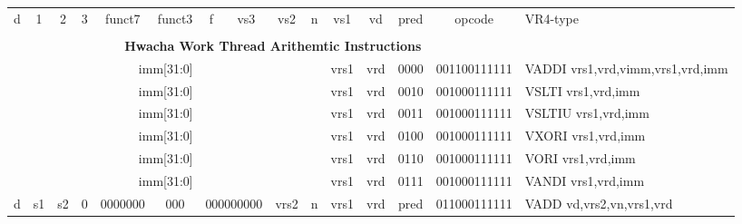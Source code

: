 \begin{landscape}
\begin{table}[p]
\begin{small}
\begin{center}
\begin{tabular}{p{0.08in}@{}p{0.08in}@{}p{0.08in}@{}p{0.08in}@{}p{0.50in}@{}p{0.30in}@{}p{0.08in}@{}p{0.8in}@{}p{0.48in}@{}p{0.32in}@{}p{0.08in}@{}p{0.8in}@{}p{0.8in}@{}p{0.4in}@{}p{0.56in}l}
\multicolumn{1}{|c|}{d} &
\multicolumn{1}{c|}{1} &
\multicolumn{1}{c|}{2} &
\multicolumn{1}{c|}{3} &
\multicolumn{1}{c|}{funct7} &
\multicolumn{1}{c|}{funct3} &
\multicolumn{1}{c|}{f} &
\multicolumn{1}{c|}{vs3} &
\multicolumn{2}{c|}{vs2} &
\multicolumn{1}{c|}{n} &
\multicolumn{1}{c|}{vs1} &
\multicolumn{1}{c|}{vd} &
\multicolumn{1}{c|}{pred} &
\multicolumn{1}{c|}{opcode} &
VR4-type \\
\cline{1-15}


&
\multicolumn{14}{c}{} & \\
&
\multicolumn{14}{c}{\bf Hwacha Work Thread Arithemtic Instructions} & \\
\cline{1-15}
  

\multicolumn{11}{|c|}{imm[31:0]} &
\multicolumn{1}{c|}{vrs1} &
\multicolumn{1}{c|}{vrd} &
\multicolumn{1}{c|}{0000} &
\multicolumn{1}{c|}{001100111111} & VADDI vrs1,vrd,vimm,vrs1,vrd,imm \\
\cline{1-15}
  

\multicolumn{11}{|c|}{imm[31:0]} &
\multicolumn{1}{c|}{vrs1} &
\multicolumn{1}{c|}{vrd} &
\multicolumn{1}{c|}{0010} &
\multicolumn{1}{c|}{001000111111} & VSLTI vrs1,vrd,imm \\
\cline{1-15}
  

\multicolumn{11}{|c|}{imm[31:0]} &
\multicolumn{1}{c|}{vrs1} &
\multicolumn{1}{c|}{vrd} &
\multicolumn{1}{c|}{0011} &
\multicolumn{1}{c|}{001000111111} & VSLTIU vrs1,vrd,imm \\
\cline{1-15}
  

\multicolumn{11}{|c|}{imm[31:0]} &
\multicolumn{1}{c|}{vrs1} &
\multicolumn{1}{c|}{vrd} &
\multicolumn{1}{c|}{0100} &
\multicolumn{1}{c|}{001000111111} & VXORI vrs1,vrd,imm \\
\cline{1-15}
  

\multicolumn{11}{|c|}{imm[31:0]} &
\multicolumn{1}{c|}{vrs1} &
\multicolumn{1}{c|}{vrd} &
\multicolumn{1}{c|}{0110} &
\multicolumn{1}{c|}{001000111111} & VORI vrs1,vrd,imm \\
\cline{1-15}
  

\multicolumn{11}{|c|}{imm[31:0]} &
\multicolumn{1}{c|}{vrs1} &
\multicolumn{1}{c|}{vrd} &
\multicolumn{1}{c|}{0111} &
\multicolumn{1}{c|}{001000111111} & VANDI vrs1,vrd,imm \\
\cline{1-15}
  

\multicolumn{1}{|c|}{d} &
\multicolumn{1}{c|}{s1} &
\multicolumn{1}{c|}{s2} &
\multicolumn{1}{c|}{0} &
\multicolumn{1}{c|}{0000000} &
\multicolumn{1}{c|}{000} &
\multicolumn{2}{c|}{000000000} &
\multicolumn{2}{c|}{vrs2} &
\multicolumn{1}{c|}{n} &
\multicolumn{1}{c|}{vrs1} &
\multicolumn{1}{c|}{vrd} &
\multicolumn{1}{c|}{pred} &
\multicolumn{1}{c|}{011000111111} & VADD vd,vrs2,vn,vrs1,vrd \\
\cline{1-15}
  


\end{tabular}
\end{center}
\end{small}
\end{table}
\end{landscape}
